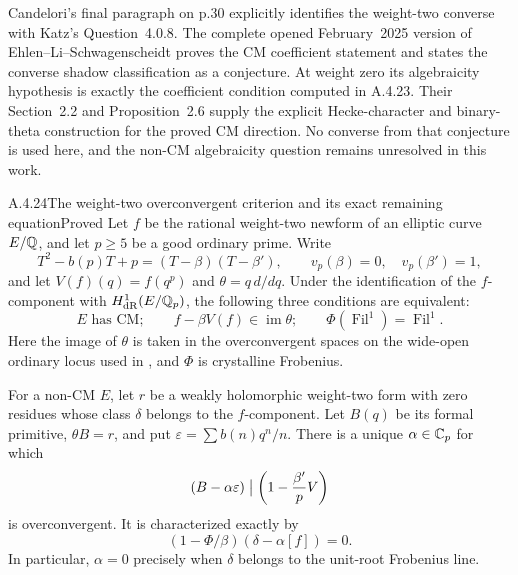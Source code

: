Candelori's final paragraph on p.30 explicitly identifies the weight-two converse with Katz's Question~4.0.8. The complete opened February~2025 version of Ehlen--Li--Schwagenscheidt \cite[Corollary 1.2 and Conjecture 1.5, pp.3--4]{EllEhlenLiSchwagenscheidt2024} proves the CM coefficient statement and states the converse shadow classification as a conjecture. At weight zero its algebraicity hypothesis is exactly the coefficient condition computed in A.4.23. Their Section~2.2 and Proposition~2.6 supply the explicit Hecke-character and binary-theta construction for the proved CM direction. No converse from that conjecture is used here, and the non-CM algebraicity question remains unresolved in this work.

\begin{result}{A.4.24}{The weight-two overconvergent criterion and its exact remaining equation}{Proved}
Let $f$ be the rational weight-two newform of an elliptic curve $E/\mathbb Q$, and let $p\ge5$ be a good ordinary prime. Write
\[
 T^2-b(p)T+p=(T-\beta)(T-\beta'),\qquad
 v_p(\beta)=0,\quad v_p(\beta')=1,
\]
and let $V(f)(q)=f(q^p)$ and $\theta=q\,d/dq$. Under the identification of the $f$-component with $H^1_{\mathrm{dR}}(E/\mathbb Q_p)$, the following three conditions are equivalent:
\[
 E\text{ has CM};\qquad
 f-\beta V(f)\in\operatorname{im}\theta;\qquad
 \Phi(\operatorname{Fil}^1)=\operatorname{Fil}^1.
\]
Here the image of $\theta$ is taken in the overconvergent spaces on the wide-open ordinary locus used in \cite[Theorem 3.3]{EllCandeloriCastella2017}, and $\Phi$ is crystalline Frobenius.

For a non-CM $E$, let $r$ be a weakly holomorphic weight-two form with zero residues whose class $\delta$ belongs to the $f$-component. Let $B(q)$ be its formal primitive, $\theta B=r$, and put $\varepsilon=\sum b(n)q^n/n$. There is a unique $\alpha\in\mathbb C_p$ for which
\[
 (B-\alpha\varepsilon)\bigm|\left(1-\frac{\beta'}pV\right)
\]
is overconvergent. It is characterized exactly by
\[
 (1-\Phi/\beta)(\delta-\alpha[f])=0.
\]
In particular, $\alpha=0$ precisely when $\delta$ belongs to the unit-root Frobenius line.
\end{result}
